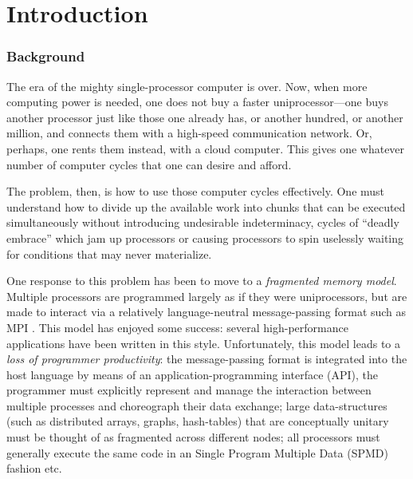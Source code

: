 
\chapter{Introduction}

\subsection*{Background}



The era of the mighty single-processor computer is over. Now, when more
computing power is needed, one does not buy a faster uniprocessor---one buys
another processor just like those one already has, or another hundred, or
another million, and connects them with a high-speed communication network.
Or, perhaps, one rents them instead, with a cloud computer. This gives one
whatever number of computer cycles that one can desire and afford.

The problem, then, is how to use those computer cycles
effectively. One must understand how to divide up the available work
into chunks that can be executed simultaneously without introducing
undesirable indeterminacy, cycles of ``deadly embrace'' which jam up
processors or causing processors to spin uselessly waiting for
conditions that may never materialize. 

One response to this problem has been to move to a {\em fragmented memory
  model}. Multiple processors are programmed largely as if they were
uniprocessors, but are made to interact via a relatively language-neutral
message-passing format such as MPI \cite{mpi}. This model has enjoyed some
success: several high-performance applications have been written in this
style. Unfortunately, this model leads to a {\em loss of programmer
  productivity}: the message-passing format is integrated into the host
language by means of an application-programming interface (API), the
programmer must explicitly represent and manage the interaction between
multiple processes and choreograph their data exchange; large data-structures
(such as distributed arrays, graphs, hash-tables) that are conceptually
unitary must be thought of as fragmented across different nodes; all
processors must generally execute the same code in an Single Program Multiple Data (SPMD)
fashion etc.


